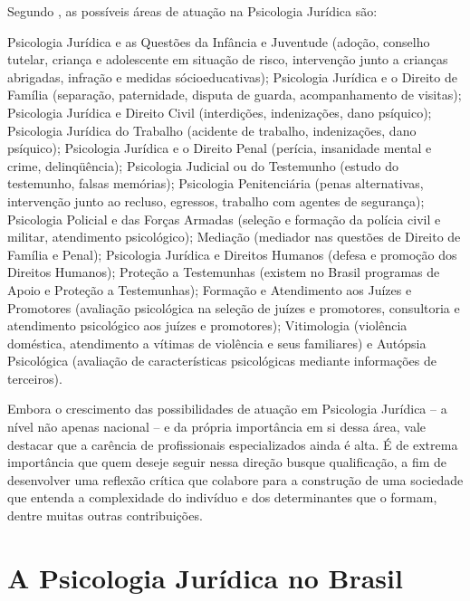 Segundo , as possíveis áreas de atuação na Psicologia Jurídica são:

\begin{citacao}
	Psicologia Jurídica e as Questões da Infância e Juventude (adoção, conselho tutelar, criança e adolescente em situação de risco, intervenção junto a crianças abrigadas, infração e medidas sócioeducativas); Psicologia Jurídica e o Direito de Família (separação, paternidade, disputa de guarda, acompanhamento de visitas); Psicologia Jurídica e Direito Civil (interdições, indenizações, dano psíquico); Psicologia Jurídica do Trabalho (acidente de trabalho, indenizações, dano psíquico); Psicologia Jurídica e o Direito Penal (perícia, insanidade mental e crime, delinqüência); Psicologia Judicial ou do Testemunho (estudo do testemunho, falsas memórias); Psicologia Penitenciária (penas alternativas, intervenção junto ao recluso, egressos, trabalho com agentes de segurança); Psicologia Policial e das Forças Armadas (seleção e formação da polícia civil e militar, atendimento psicológico); Mediação (mediador nas questões de Direito de Família e Penal); Psicologia Jurídica e Direitos Humanos (defesa e promoção dos Direitos Humanos); Proteção a Testemunhas (existem no Brasil programas de Apoio e Proteção a Testemunhas); Formação e Atendimento aos Juízes e Promotores (avaliação psicológica na seleção de juízes e promotores, consultoria e atendimento psicológico aos juízes e promotores); Vitimologia (violência doméstica, atendimento a vítimas de violência e seus familiares) e Autópsia Psicológica (avaliação de características psicológicas mediante informações de terceiros).
\end{citacao}

Embora o crescimento das possibilidades de atuação em Psicologia Jurídica -- a nível não apenas nacional -- e da própria importância em si dessa área, vale destacar que a carência de profissionais especializados ainda é alta. É de extrema importância que quem deseje seguir nessa direção busque qualificação, a fim de desenvolver uma reflexão crítica que colabore para a construção de uma sociedade que entenda a complexidade do indivíduo e dos determinantes que o formam, dentre muitas outras contribuições.

\section{A Psicologia Jurídica no Brasil}

